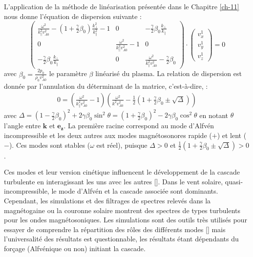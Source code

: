 L'application de la méthode de linéarisation présentée dans le Chapitre \ref{ch-11} nous donne l'équation de dispersion suivante :
\begin{equation}
    \begin{pmatrix}
\label{eq:lin_cpi_eqdis}    \frac{\omega^2}{k^2_{\parallel} v^2_{A0}} - \left(1+\frac{\gamma}{2} \beta_0\right)  \frac{k^2_{\perp}}{k^2_{\parallel}} - 1 & 0 & - \frac{\gamma}{2} \beta_0  \frac{k_{\perp}}{k_{\parallel}} \\
    0 & \frac{\omega^2}{k^2_{\parallel} v^2_{A0}} - 1  & 0 \\
     - \frac{\gamma}{2} \beta_0  \frac{k_{\perp}}{k_{\parallel}}  & 0 &\frac{\omega^2}{k^2_{\parallel} v^2_{A0}} -  \frac{\gamma}{2} \beta_0   
    \end{pmatrix} 
    \cdot \begin{pmatrix}
    v^{1}_x \\ v^{1}_y \\ v^{1}_z
    \end{pmatrix} = 0
\end{equation}
avec $\beta_0 = \frac{2p_0}{\rho_0 v^2_{A0}}$ le paramètre $\beta$ linéarisé du plasma. 
La relation de dispersion est donnée par l'annulation du déterminant de la matrice, c'est-à-dire, :
\begin{eqnarray}
 \label{eq:lin_cpi_disp}   0 = \left(\frac{\omega^2}{k^2_{\parallel} v^2_{A0}} - 1 \right)\left(\frac{\omega^2}{k^2 v^2_{A0}} - \frac{1}{2} \left(1+ \frac{\gamma}{2} \beta_0 \pm \sqrt{\Delta}\right)\right)
\end{eqnarray}
avec $\Delta = \left(1- \frac{\gamma}{2} \beta_0\right)^2 +2 \gamma \beta_0\sin^2\theta  = \left(1+ \frac{\gamma}{2} \beta_0\right)^2 -2 \gamma \beta_0\cos^2\theta$ en notant $\theta$ l'angle entre $\boldsymbol{k}$ et $\boldsymbol{e_z}$. La première racine correspond au mode d'Alfvén incompressible et les deux autres aux modes magnétosonores rapide ($+$) et lent ($-$). Ces modes sont stables ($\omega$ est réel), puisque $\Delta > 0$ et $\frac{1}{2} \left(1+ \frac{\gamma}{2} \beta_0 \pm \sqrt{\Delta}\right)>0$. 

Ces modes et leur version cinétique influencent le développement de la cascade turbulente en interagissant les uns avec les autres [\cite{cho_compressible_2003,sharma_nonlinear_2011,andres_interplay_2017,brodiano_spatiotemporal_2021,galtier_fast_2023}]. Dans le vent solaire, quasi-incompressible, le mode d'Alfvén et la cascade associée sont dominants. Cependant, les simulations et des filtrages de spectres relevés dans la magnétogaine ou la couronne solaire montrent des spectres de types turbulents pour les ondes magnétosoniques. Les simulations sont des outils très utilisés pour essayer de comprendre la répartition des rôles des différents modes [\cite{brodiano_spatiotemporal_2021}] mais l'universalité des résultats est questionnable, les résultats étant dépendants du forçage (Alfvénique ou non) initiant la cascade.  

